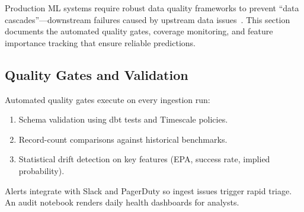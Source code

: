Production ML systems require robust data quality frameworks to prevent ``data cascades''---downstream failures caused by upstream data issues~\cite{sambasivan2021everyone, breck2019data}. This section documents the automated quality gates, coverage monitoring, and feature importance tracking that ensure reliable predictions.

\subsection{Quality Gates and Validation}
Automated quality gates execute on every ingestion run:
\begin{enumerate}
  \item Schema validation using dbt tests and Timescale policies.
  \item Record-count comparisons against historical benchmarks.
  \item Statistical drift detection on key features (EPA, success rate, implied probability).
\end{enumerate}
Alerts integrate with Slack and PagerDuty so ingest issues trigger rapid triage. An audit notebook renders daily health dashboards for analysts.

